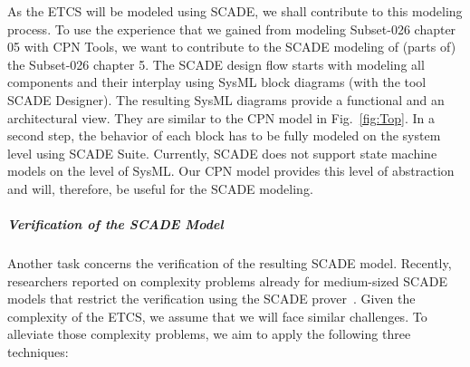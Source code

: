 As the ETCS will be modeled using SCADE, we shall contribute to this modeling process. To use the experience that we gained from modeling Subset-026 chapter 05 with CPN Tools, we want to contribute to the SCADE modeling of (parts of) the Subset-026 chapter 5. The SCADE design flow starts with modeling all components and their interplay using SysML block diagrams (with the tool SCADE Designer). The resulting SysML diagrams provide a functional and an architectural view. They are similar to the CPN model in Fig.~\ref{fig:Top}. In a second step, the behavior of each block has to be fully modeled on the system level using SCADE Suite. Currently, SCADE does not support state machine models on the level of SysML. Our CPN model provides this level of abstraction and will, therefore, be useful for the SCADE modeling.


\subparagraph{Verification of the SCADE Model}

Another task concerns the verification of the resulting SCADE model. Recently, researchers reported on complexity problems already for medium-sized SCADE models that restrict the verification using the SCADE prover~\cite{HuhnM2014scp,DaskayaHM2011fmics}. Given the complexity of the ETCS, we assume that we will face similar challenges. To alleviate those complexity problems, we aim to apply the following three techniques:

